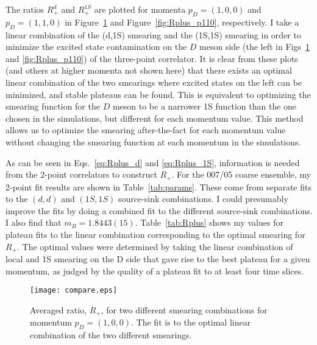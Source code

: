 \documentclass[11pt]{article}
\begin{document}
The ratios $R_+^d$ and $R_+^{1S}$ are plotted for momenta $p_D=(1,0,0)$ and $p_D=(1,1,0)$ in Figure~\ref{fig:Rplus_p100} and Figure~\ref{fig:Rplus_p110}, respectively.  I take a linear combination of the (d,1S) smearing and the (1S,1S) smearing in order to minimize the excited state contamination on the $D$ meson side (the left in Figs~\ref{fig:Rplus_p100} and \ref{fig:Rplus_p110}) of the three-point correlator.  It is clear from these plots (and others at higher momenta not shown here) that there exists an optimal linear combination of the two smearings where excited states on the left can be minimized, and stable plateaus can be found.  This is equivalent to optimizing the smearing function for the $D$ meson to be a narrower 1S function than the one chosen in the simulations, but different for each momentum value.  This method allows us to optimize the smearing after-the-fact for each momentum value without changing the smearing function at each momentum in the simulations.  

As can be seen in Eqs.~\ref{eq:Rplus_d} and \ref{eq:Rplus_1S}, information is needed from the 2-point correlators to construct $R_+$.  For the 007/05 coarse ensemble, my 2-point fit results are shown in Table~\ref{tab:params}.  These come from separate fits to the $(d,d)$ and $(1S,1S)$ source-sink combinations.  I could presumably improve the fits by doing a combined fit to the different source-sink combinations.  I also find that $m_B=1.8443(15)$.  Table~\ref{tab:Rplus} shows my values for plateau fits to the linear combination corresponding to the optimal smearing for $R_+$.  The optimal values were determined by taking the linear combination of local and 1S smearing on the D side that gave rise to the best plateau for a given momentum, as judged by the quality of a plateau fit to at least four time slices.

\begin{figure}
\begin{center}
 \texttt{[image: compare.eps]}
\end{center}
\caption{Averaged ratio, $\overline{R}_{+}$, for two different smearing combinations for momentum $p_D=(1,0,0)$.  The fit is to the optimal linear combination of the two different smearings.
\label{fig:Rplus_p100}}
\end{figure}
\end{document}
